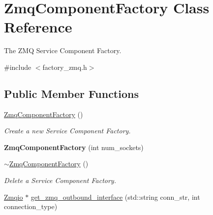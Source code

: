 \hypertarget{classZmqComponentFactory}{}\section{Zmq\+Component\+Factory Class Reference}
\label{classZmqComponentFactory}


The Z\+MQ Service Component Factory.  




{\ttfamily \#include $<$factory\+\_\+zmq.\+h$>$}

\subsection*{Public Member Functions}
\begin{DoxyCompactItemize}
\item 
\hyperlink{classZmqComponentFactory_a453e53f66ed31f7d42156c4c351a8969}{Zmq\+Component\+Factory} ()\hypertarget{classZmqComponentFactory_a453e53f66ed31f7d42156c4c351a8969}{}\label{classZmqComponentFactory_a453e53f66ed31f7d42156c4c351a8969}

\begin{DoxyCompactList}\small\item\em Create a new Service Component Factory. \end{DoxyCompactList}\item 
{\bfseries Zmq\+Component\+Factory} (int num\+\_\+sockets)\hypertarget{classZmqComponentFactory_ab90c074a00528e7b475a4c212137168e}{}\label{classZmqComponentFactory_ab90c074a00528e7b475a4c212137168e}

\item 
\hyperlink{classZmqComponentFactory_a8cf8d605f3cf8a81f008549a85089adf}{$\sim$\+Zmq\+Component\+Factory} ()\hypertarget{classZmqComponentFactory_a8cf8d605f3cf8a81f008549a85089adf}{}\label{classZmqComponentFactory_a8cf8d605f3cf8a81f008549a85089adf}

\begin{DoxyCompactList}\small\item\em Delete a Service Component Factory. \end{DoxyCompactList}\item 
\hyperlink{classZmqio}{Zmqio} $\ast$ \hyperlink{classZmqComponentFactory_a17f303d9fba693b9ee69f6dc09588038}{get\+\_\+zmq\+\_\+outbound\+\_\+interface} (std\+::string conn\+\_\+str, int connection\+\_\+type)\hypertarget{classZmqComponentFactory_a17f303d9fba693b9ee69f6dc09588038}{}\label{classZmqComponentFactory_a17f303d9fba693b9ee69f6dc09588038}


\end{DoxyCompactItemize}
